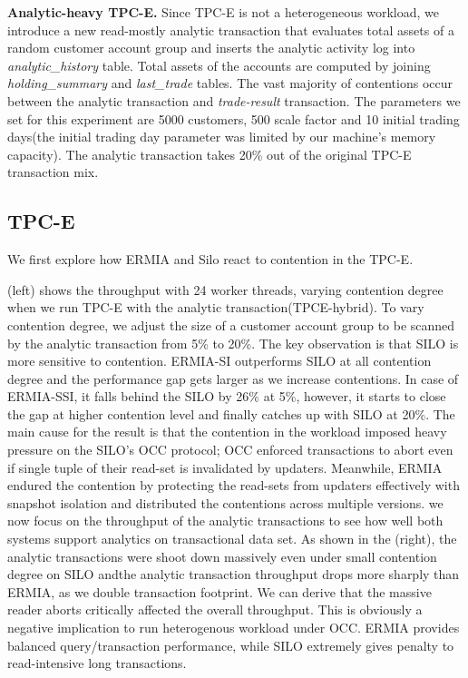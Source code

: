 \textbf{Analytic-heavy TPC-E.}
Since TPC-E is not a heterogeneous workload, we introduce a new read-mostly analytic transaction that evaluates total assets of a random customer account group and inserts the analytic activity log into \textit{analytic\_history} table. Total assets of the accounts are computed by joining \textit{holding\_summary} and \textit{last\_trade} tables. The vast majority of contentions occur between the analytic transaction and \textit{trade-result} transaction.
The parameters we set for this experiment are 5000 customers, 500 scale factor and 10 initial trading days(the initial trading day parameter was limited by our machine's memory capacity).
The analytic transaction takes 20\% out of the original TPC-E transaction mix. %

\subsection{TPC-E}
We first explore how ERMIA and Silo react to contention in the TPC-E.


(left) shows the throughput with 24 worker threads, varying contention degree when we run TPC-E with the analytic transaction(TPCE-hybrid). To vary contention degree, we adjust the size of a customer account group to be scanned by the analytic transaction from 5\% to 20\%. The key observation is that SILO is more sensitive to contention. ERMIA-SI outperforms SILO at all contention degree and the performance gap gets larger as we increase contentions. In case of ERMIA-SSI, it falls behind the SILO by 26\% at 5\%, however, it starts to close the gap at higher contention level and finally catches up with SILO at 20\%. 
The main cause for the result is that the contention in the workload imposed heavy pressure on the SILO's OCC protocol; OCC enforced transactions to abort even if single tuple of their read-set is invalidated by updaters. Meanwhile, ERMIA endured the contention by protecting the read-sets from updaters effectively with snapshot isolation and distributed the contentions across multiple versions. 
we now focus on the throughput of the analytic transactions to see how well both systems support analytics on transactional data set. As shown in the (right), the analytic transactions were shoot down massively even under small contention degree on SILO andthe analytic transaction throughput drops more sharply than ERMIA, as we double transaction footprint. We can derive that the massive reader aborts critically affected the overall throughput. This is obviously a negative implication to run heterogenous workload under OCC. ERMIA provides balanced query/transaction performance, while SILO extremely gives penalty to read-intensive long transactions. 


